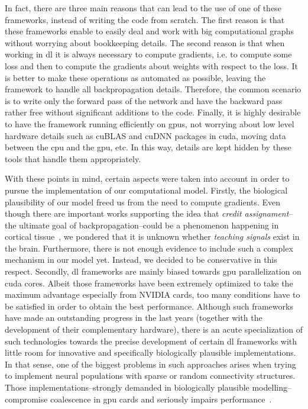 {In fact, there are three main reasons that can lead to the use of one of these frameworks, instead of writing the code from scratch. The first reason is that these frameworks enable to easily deal and work with big computational graphs without worrying about bookkeeping details. The second reason is that when working in \gls{dl} it is always necessary to compute gradients, i.e. to compute some loss and then to compute the gradients about weights with respect to the loss. It is better to make these operations as automated as possible, leaving the framework to handle all backpropagation details. Therefore, the common scenario is to write only the forward pass of the network and have the backward pass rather free without significant additions to the code. Finally, it is highly desirable to have the framework running efficiently on \glspl{gpu}, not worrying about low level hardware details such as cuBLAS and cuDNN packages in \gls{cuda}, moving data between the \gls{cpu} and the \gls{gpu}, etc. In this way, details are kept hidden by these tools that handle them appropriately.

With these points in mind, certain aspects were taken into account in order to pursue the implementation of our computational model. Firstly, the biological plausibility of our model freed us from the need to compute gradients. Even though there are important works supporting the idea that \emph{credit assignament}--the ultimate goal of backpropagation--could be a phenomenon happening in cortical tissue~\cite{Guerguiev2017TowardsDL}, we pondered that it is unknown whether \emph{teaching signals} exist in the brain. Furthermore, there is not enough evidence to include such a complex mechanism in our model yet. Instead, we decided to be conservative in this respect. Secondly, \gls{dl} frameworks are mainly biased towards \gls{gpu} parallelization on \gls{cuda} cores. Albeit those frameworks have been extremely optimized to take the maximum advantage especially from NVIDIA cards, too many conditions have to be satisfied in order to obtain the best performance. Although such frameworks have made an outstanding progress in the last years (together with the development of their complementary hardware), there is an acute specialization of such technologies towards the precise development of certain \gls{dl} frameworks with little room for innovative and specifically biologically plausible implementations. In that sense, one of the biggest problems in such approaches arises when trying to implement neural populations with sparse or random connectivity structures. Those implementations--strongly demanded in biologically plausible modelling--compromise coalescence in \gls{gpu} cards and seriously impairs performance~\cite{doi:10.3109/0954898X.2012.739292}.

}
